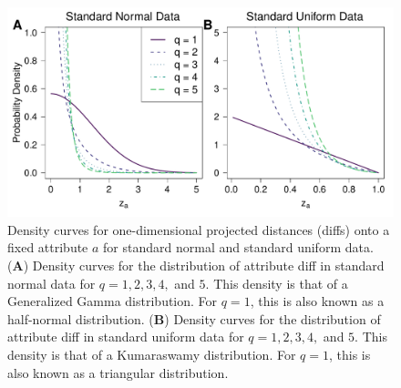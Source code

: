 \documentclass[10pt,letterpaper]{article}\usepackage[]{graphicx}\usepackage[]{color}
\begin{document}
\begin{figure}[H]
	\includegraphics[width=\textwidth]{standard_normal_and_uniform_diffs.pdf}
	\caption{Density curves for one-dimensional projected distances (diffs) onto a fixed attribute $a$ for standard normal and standard uniform data. (\textbf{A}) Density curves for the distribution of attribute diff in standard normal data for $q=1,2,3,4,$ and $5$. This density is that of a Generalized Gamma distribution. For $q=1$, this is also known as a half-normal distribution. (\textbf{B}) Density curves for the distribution of attribute diff in standard uniform data for $q=1,2,3,4,$ and $5$. This density is that of a Kumaraswamy distribution. For $q=1$, this is also known as a triangular distribution.}
\end{figure}

\vspace{2cm}
\end{document}
